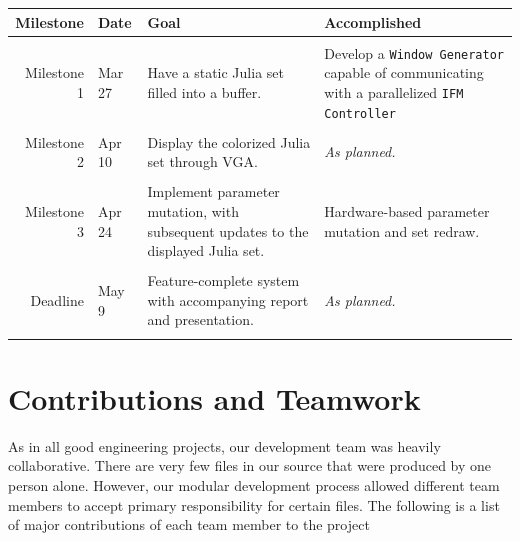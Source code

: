 \documentclass{article}
\begin{document}
\begin{tabular}{rlp{4.5cm}p{4.5cm}}
\textbf{Milestone}&\textbf{Date}&\textbf{Goal}&\textbf{Accomplished}\\ \hline
&&&\\
Milestone 1&Mar 27&Have a static Julia set filled into a buffer.&
	Develop a \texttt{Window Generator} capable of communicating with a parallelized \texttt{IFM Controller}\\
&&&\\
Milestone 2&Apr 10&Display the colorized Julia set through VGA.&\textit{As planned.}\\
&&&\\
Milestone 3&Apr 24&Implement parameter mutation, with subsequent updates to the displayed Julia set.&
	Hardware-based parameter mutation and set redraw.\\
&&&\\
Deadline&May 9&Feature-complete system with accompanying report and presentation.&\textit{As planned.}\\
&&&\\
\end{tabular}

\section{Contributions and Teamwork}

As in all good engineering projects, our development team was heavily collaborative. There are very few
files in our source that were produced by one person alone. However, our modular development process allowed
different team members to accept primary responsibility for certain files. The following is a list of major
contributions of each team member to the project 
\end{document}
